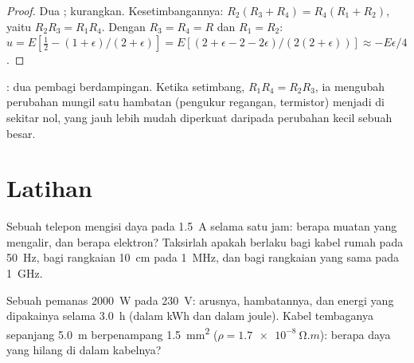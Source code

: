 \begin{proof}
Dua ; kurangkan. Kesetimbangannya: $R_2(R_3 + R_4) = R_4(R_1 +
R_2)$, yaitu $R_2R_3 = R_1R_4$. Dengan $R_3 = R_4 = R$ dan $R_1 = R_2$:
$u = E[\tfrac12 - (1 + \epsilon)/(2 + \epsilon)] = E[(2 + \epsilon - 2 -
2\epsilon)/(2(2 + \epsilon))] \approx -E\epsilon/4$.
\end{proof}

\begin{omfigure}

{\small {}: dua pembagi berdampingan. Ketika setimbang,
$R_1R_4 = R_2R_3$, ia mengubah perubahan mungil satu hambatan (pengukur
regangan, termistor) menjadi  di sekitar nol, yang jauh lebih
mudah diperkuat daripada perubahan kecil sebuah  besar.}
\end{omfigure}

\section{Latihan}

\begin{exercise}[$\star$]\label{exo:b1:dc-circuits:1}
Sebuah telepon mengisi daya pada \qty{1.5}{A} selama satu jam: berapa
muatan yang mengalir, dan berapa elektron? Taksirlah apakah  berlaku bagi kabel rumah pada \qty{50}{Hz}, bagi rangkaian
\qty{10}{cm} pada \qty{1}{MHz}, dan bagi rangkaian yang sama pada \qty{1}{GHz}.
\end{exercise}

\begin{exercise}[$\star$]\label{exo:b1:dc-circuits:2}
Sebuah pemanas \qty{2000}{W} pada \qty{230}{V}: arusnya, hambatannya,
dan energi yang dipakainya selama \qty{3.0}{h} (dalam kWh dan dalam
joule). Kabel tembaganya sepanjang \qty{5.0}{m} berpenampang
\qty{1.5}{mm^2} ($\rho = \qty{1.7e-8}{\ohm.m}$): berapa daya yang hilang
di dalam kabelnya?
\end{exercise}

